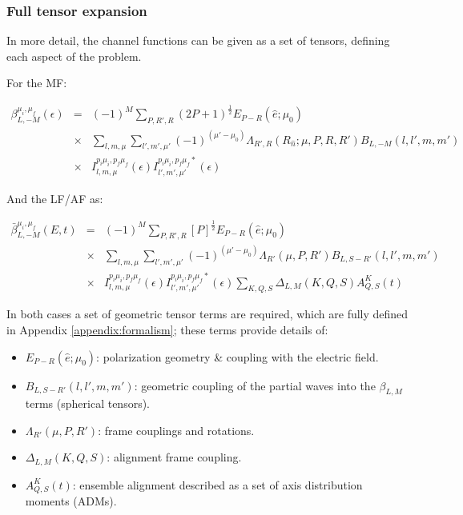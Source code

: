 \subsubsection{Full tensor expansion}

In more detail, the channel functions can be given as a set of tensors, defining each aspect of the problem.

For the MF:

\begin{eqnarray}
\beta_{L,-M}^{\mu_{i},\mu_{f}}(\epsilon) & = & (-1)^{M}\sum_{P,R',R}(2P+1)^{\frac{1}{2}}{E_{P-R}(\hat{e};\mu_{0})}\\
 & \times &\sum_{l,m,\mu}\sum_{l',m',\mu'}(-1)^{(\mu'-\mu_{0})}{\Lambda_{R',R}(R_{\hat{n}};\mu,P,R,R')B_{L,-M}(l,l',m,m')}\\
 & \times & I_{l,m,\mu}^{p_{i}\mu_{i},p_{f}\mu_{f}}(\epsilon)I_{l',m',\mu'}^{p_{i}\mu_{i},p_{f}\mu_{f}*}(\epsilon)\label{eq:BLM-tensor-MF}
\end{eqnarray}

And the LF/AF as:

\begin{eqnarray}
\bar{\beta}_{L,-M}^{\mu_{i},\mu_{f}}(E,t) & = & (-1)^{M}\sum_{P,R',R}{[P]^{\frac{1}{2}}}{E_{P-R}(\hat{e};\mu_{0})}\\
 & \times &\sum_{l,m,\mu}\sum_{l',m',\mu'}(-1)^{(\mu'-\mu_{0})}{\Lambda_{R'}(\mu,P,R')B_{L,S-R'}(l,l',m,m')}\\
 & \times &I_{l,m,\mu}^{p_{i}\mu_{i},p_{f}\mu_{f}}(\epsilon)I_{l',m',\mu'}^{p_{i}\mu_{i},p_{f}\mu_{f}*}(\epsilon)\sum_{K,Q,S}\Delta_{L,M}(K,Q,S)A_{Q,S}^{K}(t)\label{eq:BLM-tensor-AF}
\end{eqnarray}

In both cases a set of geometric tensor terms are required, which are fully defined in Appendix \ref{appendix:formalism}; these terms provide details of:

\begin{itemize}
\item ${E_{P-R}(\hat{e};\mu_{0})}$: polarization geometry \& coupling with the electric field.
\item $B_{L,S-R'}(l,l',m,m')$: geometric coupling of the partial waves into the $\beta_{L,M}$ terms (spherical tensors).
\item $\Lambda_{R'}(\mu,P,R')$: frame couplings and rotations.
\item $\Delta_{L,M}(K,Q,S)$: alignment frame coupling.
\item $A_{Q,S}^{K}(t)$: ensemble alignment described as a set of axis distribution moments (ADMs).
\end{itemize}

